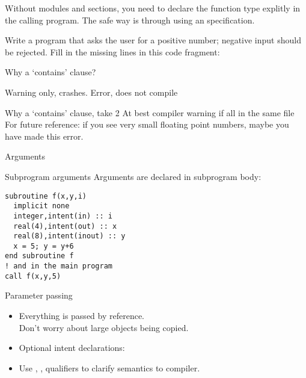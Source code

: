 \begin{f77note}
  Without modules and  sections, you need to declare the
  function type explitly in the calling program. The safe way is
  through using an  specification.
\end{f77note}

\begin{exercise}
  \label{ex:freadpos}
  Write a program that asks the user for a positive number; negative
  input should be rejected.  Fill in the missing lines in this code
  fragment:
\end{exercise}

\begin{block}{Why a `contains' clause?}
  \label{sl:whycontain}
  \begin{multicols}{2}
    Warning only, crashes.
    \vfill\columnbreak
    Error, does not compile
  \end{multicols}
\end{block}

\begin{block}{Why a `contains' clause, take 2}
  \label{sl:whycontain_type}
  At best compiler warning if all in the same file\\
  For future reference: if you see very small floating point numbers,
  maybe you have made this error.
\end{block}

 {Arguments}

\begin{block}{Subprogram arguments}
  \label{sl:farguments}
 Arguments are declared in subprogram body:
\begin{lstlisting}
subroutine f(x,y,i)
  implicit none
  integer,intent(in) :: i
  real(4),intent(out) :: x
  real(8),intent(inout) :: y
  x = 5; y = y+6
end subroutine f
! and in the main program
call f(x,y,5)
\end{lstlisting}
\end{block}

\begin{block}{Parameter passing}
  \label{sl:fpassing}
  \begin{itemize}
  \item Everything is passed by reference.\\
    Don't worry about large objects being copied.
  \item Optional intent declarations:
  \item Use , ,  qualifiers to clarify semantics
    to compiler.
  \end{itemize}
\end{block}

